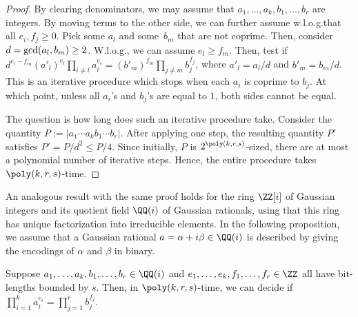 \begin{proof}
By clearing denominators, we may assume that $a_1,\dots,a_k,b_1,\dots,b_r$ are integers.
By moving terms to the other side, we can further assume w.l.o.g.that all $e_i, f_j \geq 0$.
Pick some $a_l$ and some~$b_m$ that are not coprime. Then, consider $d = {\rm gcd}(a_l, b_m) \geq 2$. W.l.o.g., we can assume $e_l \geq f_m$.
Then, test if $ d^{e_l - f_m} (a'_l)^{e_l}\prod_{i \neq l} a_i^{e_i}  =  (b'_m)^{f_m} \prod_{j \neq m} b_j^{f_j}$, where $a'_l = a_l/d$ and $b'_m = b_m/d$.
This is an iterative procedure which stops when each $a_i$ is coprime to $b_j$. At which point, unless all $a_i$'s and $b_j$'s are equal to $1$, both sides cannot be equal.

The question is how long does such an iterative procedure take.
Consider the quantity $P:= |a_1\cdots a_k b_1 \cdots b_r|$.
After applying one step, the resulting quantity $P'$ satisfies
$P' = P/d^2 \le P/4$. Since initially, $P$ is $2^{\poly(k,r,s)}$-sized,
there are at most a polynomial number of iterative steps.
Hence, the entire procedure takes $\poly(k,r,s)$-time.
\end{proof}

An analogous result with the same proof holds for the ring $\ZZ[i]$ of Gaussian integers and its quotient field $\QQ(i)$ of Gaussian rationals,
using that this ring has unique factorization into irreducible elements.
In the following proposition, we assume that a Gaussian rational $a = \alpha + i \beta \in \QQ(i)$ is described by giving the encodings of $\alpha$ and $\beta$ in binary.

\begin{proposition}\label{prop:monomial}
Suppose $a_1,\dots,a_k,b_1,\dots,b_r\in \QQ(i)$ and $e_1,\dots,e_k, f_1,\dots,f_r \in \ZZ$ all have bit-lengths bounded by $s$.
Then, in $\poly(k,r,s)$-time, we can decide if $\prod_{i=1}^k a_i^{e_i} = \prod_{j=1}^r b_j^{f_j}$.
\end{proposition}

%
%
%
%


%
%
%

%
%
%


